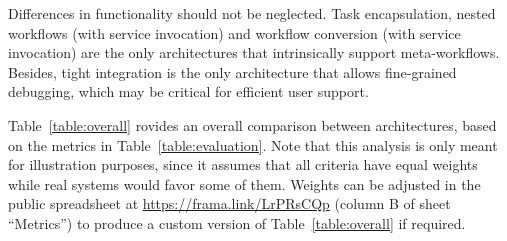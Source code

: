 \documentclass[preprint,3p,twocolumn]{elsarticle}
\newcommand{\todo}[2]{\pdfmargincomment[color=red,author=#1,open=true]{#2}}
\newcommand{\correction}[1]{\color{blue}#1\color{black}\xspace}
\begin{document}
Differences in \correction{functionality} should not be neglected. Task
encapsulation, nested workflows (with service invocation) and workflow
conversion (with service invocation) are the only architectures that
intrinsically support meta-workflows. Besides, tight integration is
the only architecture that allows fine-grained debugging, which may be
critical for efficient user support.

Table~\ref{table:overall} \todo{update with new architecture?} provides an overall comparison between
architectures, based on the metrics in Table~\ref{table:evaluation}.
Note that this analysis is only meant for illustration purposes, since
it assumes that all criteria have equal weights while real systems
would favor some of them. \correction{Weights can be adjusted in the
  public spreadsheet at \url{https://frama.link/LrPRsCQp} (column B of
  sheet ``Metrics'') to produce a custom version of
  Table~\ref{table:overall} if required.}
\end{document}
